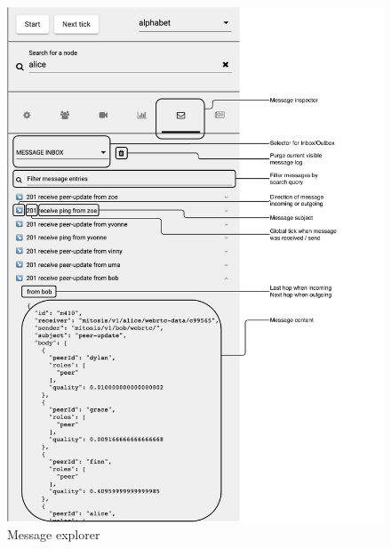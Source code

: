 \begin{figure}
\centering
\includegraphics[width=1\textwidth]{graphics/analysis-tools/visualisation-sidebar-message-explorer.pdf}
\caption{Message explorer}
\label{fig:anl-sim-message-explorer}
\end{figure}

